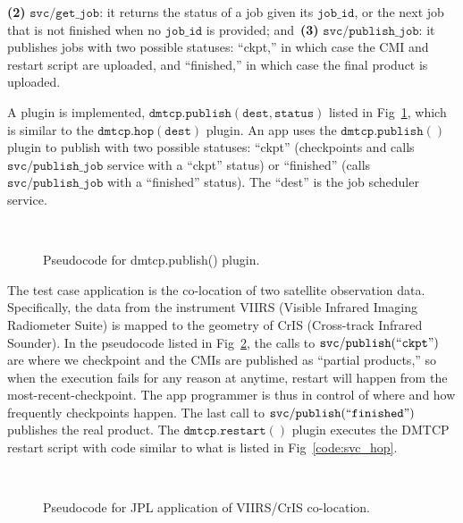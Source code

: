 \documentclass[conference]{IEEEtran}
\begin{document}
\textbf{(2)} $\mathtt{svc/get\_job}$: it returns the status of a job given its $\mathtt{job\_id}$, or the next job that is not finished when no $\mathtt{job\_id}$ is provided; and~\textbf{(3)} $\mathtt{svc/publish\_job}$: it publishes jobs with two possible statuses: ``ckpt,'' in which case the CMI and restart script are uploaded, and ``finished,'' in which case the final product is uploaded.

A plugin is implemented, $\mathtt{dmtcp.publish(dest, status)}$ listed in Fig~\ref{code:dmtcp-publish}, which is similar to the $\mathtt{dmtcp.hop(dest)}$ plugin. An app uses the $\mathtt{dmtcp.publish()}$ plugin to publish with two possible statuses: ``ckpt'' (checkpoints and calls $\mathtt{svc/publish\_job}$ service with a ``ckpt'' status) or ``finished'' (calls $\mathtt{svc/publish\_job}$ with a ``finished'' status). The ``dest'' is the job scheduler service.


\begin{figure}[!ht]
\begin{center}
\begin{center}
\mbox{}\\[0.3em]
\end{center}
\hspace{\fill}%
\caption{Pseudocode for dmtcp.publish() plugin.}
\label{code:dmtcp-publish}
\end{center}
\end{figure}


The test case application is the co-location of two satellite observation data. Specifically, the data from the instrument VIIRS (Visible Infrared Imaging Radiometer Suite) is mapped to the geometry of CrIS (Cross-track Infrared Sounder). In the pseudocode listed in Fig~\ref{code:app}, the calls to $\mathtt{svc/publish(``ckpt")}$ are where we checkpoint and the CMIs are published as ``partial products,'' so when the execution fails for any reason at anytime, restart will happen from the most-recent-checkpoint. The app programmer is thus in control of where and how frequently checkpoints happen. The last call to $\mathtt{svc/publish(``finished")}$ publishes the real product. The $\mathtt{dmtcp.restart()}$ plugin executes the DMTCP restart script with code similar to what is listed in Fig~\ref{code:svc_hop}.

\begin{figure}[!ht]
\begin{center}
\begin{center}
\mbox{}\\[0.3em]
\end{center}
\hspace{\fill}%
\caption{Pseudocode for JPL application of VIIRS/CrIS co-location.}
\label{code:app}
\end{center}
\end{figure}
\end{document}
